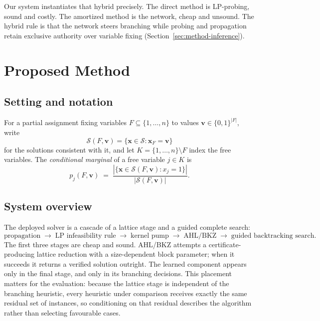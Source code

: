 \documentclass[11pt]{article}
\newcommand{\SOL}{\mathcal{S}}
\begin{document}
Our system instantiates that hybrid precisely. The direct method is LP-probing, sound and costly. The amortized method is the network, cheap and unsound. The hybrid rule is that the network steers branching while probing and propagation retain exclusive authority over variable fixing (Section~\ref{sec:method-inference}).

\section{Proposed Method}
\label{sec:method}

\subsection{Setting and notation}

For a partial assignment fixing variables $F\subseteq\{1,\dots,n\}$ to values $\mathbf{v}\in\{0,1\}^{|F|}$, write
\begin{equation}
\SOL(F,\mathbf{v}) = \{\mathbf{x}\in\SOL : \mathbf{x}_F=\mathbf{v}\}
\end{equation}
for the solutions consistent with it, and let $K=\{1,\dots,n\}\setminus F$ index the free variables. The \emph{conditional marginal} of a free variable $j\in K$ is
\begin{equation}
p_j(F,\mathbf{v}) \;=\; \frac{|\{\mathbf{x}\in\SOL(F,\mathbf{v}) : x_j=1\}|}{|\SOL(F,\mathbf{v})|}.
\label{eq:condmarg}
\end{equation}

\subsection{System overview}
\label{sec:method-cascade}

The deployed solver is a cascade of a lattice stage and a guided complete search:
\begin{equation}
\text{propagation} \;\to\; \text{LP infeasibility rule} \;\to\; \text{kernel pump} \;\to\; \text{AHL/BKZ} \;\to\; \text{guided backtracking search}.
\end{equation}
The first three stages are cheap and sound. AHL/BKZ attempts a certificate-producing lattice reduction with a size-dependent block parameter; when it succeeds it returns a verified solution outright. The learned component appears only in the final stage, and only in its branching decisions. This placement matters for the evaluation: because the lattice stage is independent of the branching heuristic, every heuristic under comparison receives exactly the same residual set of instances, so conditioning on that residual describes the algorithm rather than selecting favourable cases.
\end{document}
